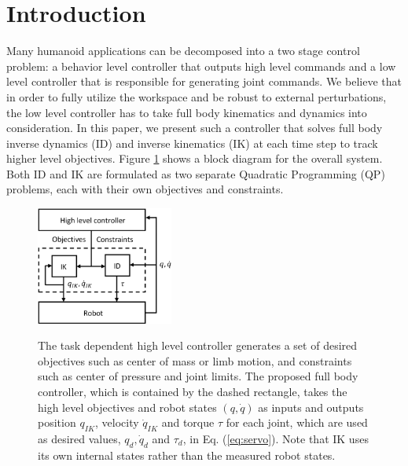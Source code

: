\documentclass{ws-ijhr}
\newcommand{\eref}[1] {Eq. (\ref{#1})}
\newcommand{\fref}[1] {Figure \ref{#1}}
\begin{document}


\section{Introduction}
Many humanoid applications can be decomposed into a two stage control problem: a 
behavior level controller that outputs high level commands and a low level 
controller that is responsible for generating joint commands. We believe that in order
to fully utilize the workspace and be robust to external perturbations, the low 
level controller has to take full body kinematics and dynamics into consideration. 
In this paper, we present such a controller that solves full body inverse 
dynamics (ID) and inverse kinematics (IK) at each time step to track higher level 
objectives. \fref{fig:sys} shows a block diagram for the 
overall system. 
Both ID and IK are formulated as two separate 
Quadratic Programming (QP) problems, each with their own objectives and 
constraints. 

\begin{figure}
  \begin{center}
    {\includegraphics[width=0.4\textwidth]{images/sys.eps}}
    \caption{
      The task dependent high level controller generates a set of desired 
      objectives such as center of mass or limb motion, 
			and constraints such as center of pressure and 
      joint limits. The proposed full body controller, which is contained by
      the dashed rectangle, takes the high level objectives and robot states 
      $(q,\dot{q})$ as inputs and outputs position $q_{IK}$, velocity 
      $\dot{q}_{IK}$ and torque $\tau$ for each joint, which are used as 
      desired values, $q_d, \dot{q}_d$ and $\tau_d$, in \eref{eq:servo}. Note that IK uses its 
      own internal states rather than the measured robot states. 
      }\label{fig:sys} 
  \end{center}
\end{figure}  
 
\end{document}
